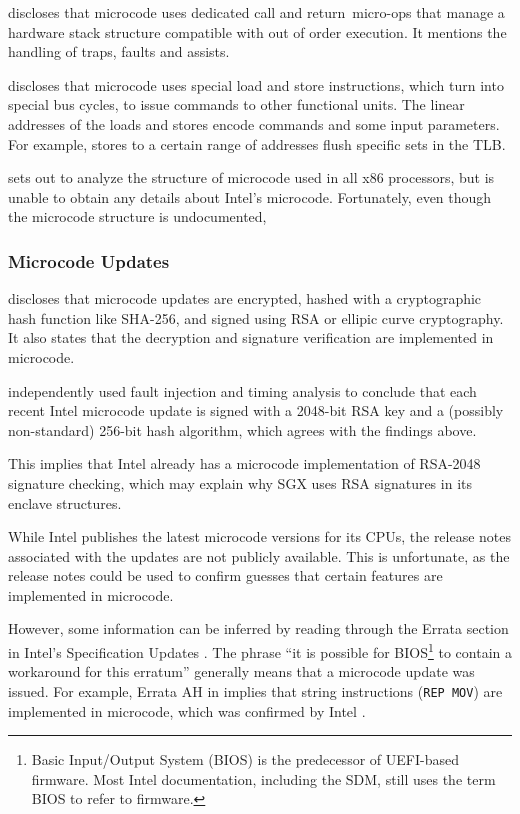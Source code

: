 \cite{intel2007microstack} discloses that microcode uses dedicated call and
return micro-ops that manage a hardware stack structure compatible with out of
order execution. It mentions the handling of traps, faults and assists.

\cite{intel1997microspace} discloses that microcode uses special load and store
instructions, which turn into special bus cycles, to issue commands to other
functional units. The linear addresses of the loads and stores encode commands
and some input parameters. For example, stores to a certain range of addresses
flush specific sets in the TLB.

\cite{chen2014microcode} sets out to analyze the structure of microcode used in
all x86 processors, but is unable to obtain any details about Intel's
microcode. Fortunately, even though the microcode structure is undocumented,



\subsubsection{Microcode Updates}


\cite{intel2012patching} discloses that microcode updates are encrypted, hashed
with a cryptographic hash function like SHA-256, and signed using RSA or
ellipic curve cryptography. It also states that the decryption and signature
verification are implemented in microcode.

\cite{hawkes2012microcode} independently used fault injection and timing
analysis to conclude that each recent Intel microcode update is signed with a
2048-bit RSA key and a (possibly non-standard) 256-bit hash algorithm, which
agrees with the findings above.

This
implies that Intel already has a microcode implementation of RSA-2048 signature
checking, which may explain why SGX uses RSA signatures in its enclave
structures.

While Intel publishes the latest microcode versions for its CPUs, the release
notes associated with the updates are not publicly available. This is
unfortunate, as the release notes could be used to confirm guesses that certain
features are implemented in microcode.

However, some information can be
inferred by reading through the Errata section in Intel's Specification Updates
\cite{intel2010errata, intel2015errata, intel2015errata2}. The phrase ``it is
possible for BIOS\footnote{Basic Input/Output System (BIOS)
is the predecessor of UEFI-based firmware. Most Intel documentation, including
the SDM, still uses the term BIOS to refer to firmware.} to contain a
workaround for this erratum'' generally means that a microcode update was
issued. For example, Errata AH in \cite{intel2010errata} implies that string
instructions (\texttt{REP MOV}) are implemented in microcode, which was
confirmed by Intel \cite{abraham2006repmov}.

